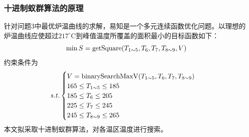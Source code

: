 \documentclass[../main.tex]{subfiles}
\begin{document}
\subsubsection{十进制蚁群算法的原理}
针对问题3中最优炉温曲线的求解，易知是一个多元连续函数优化问题。以理想的炉温曲线应使超过\(217 ^{\circ}\mathrm{C}\)到峰值温度所覆盖的面积最小的目标函数如下：
\begin{equation}
\min S = \mathrm{getSquare} (T _{1 {\sim} 5},T _{6} , T _{7} , T _{8 {\sim} 9}, V) \\
\end{equation}
约束条件为
\begin{equation}{\it s.t.}
\begin{cases}
V = \mathrm{binarySearchMaxV} (T _{1{\sim} 5}, T_{6} , T _{7},T_{8{\sim} 9})\\
165 \le T_{1 {\sim} 5} \le 185\\
185 \le T _{6} \le 205 \\
225 \le T _{7} \le 245 \\
245 \le T _{8 {\sim} 9} \le 265
\end{cases}
\end{equation}
本文拟采取十进制蚁群算法，对各温区温度进行搜索。
\end{document}

